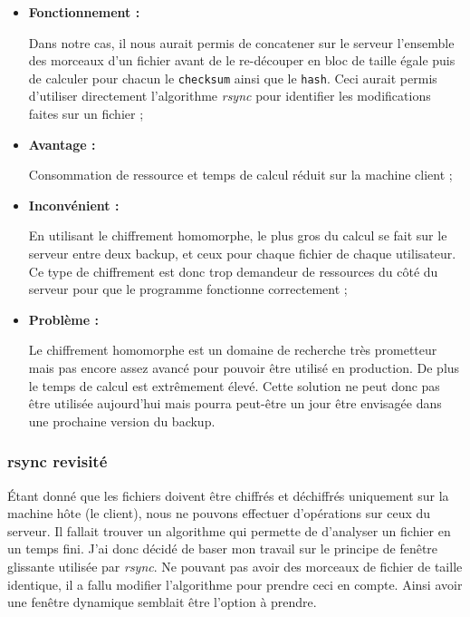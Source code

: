 \documentclass[a4paper,10pt, twoside]{report}
\begin{document}
\begin{spacing}{1.2}
\begin{itemize}
 \item \textbf{Fonctionnement :}
 
 Dans notre cas, il nous aurait permis de
 concatener sur le serveur l'ensemble des morceaux d'un fichier avant de le
 re-découper en bloc de taille égale puis de calculer pour chacun le
 \texttt{checksum} ainsi que le \texttt{hash}. Ceci aurait permis d'utiliser
 directement l'algorithme \textit{rsync} pour identifier les modifications
 faites sur un fichier ;

 \item \textbf{Avantage :}
 
 Consommation de ressource et temps de calcul
 réduit sur la machine client ;
 
 \item \textbf{Inconvénient :}
 
 En utilisant le chiffrement homomorphe, le
 plus gros du calcul se fait sur le serveur entre deux backup, et ceux pour
 chaque fichier de chaque utilisateur. Ce type de chiffrement est donc trop
 demandeur de ressources du côté du serveur pour que le programme fonctionne
 correctement ;

 \item \textbf{Problème :}
 
 Le chiffrement homomorphe est un domaine de
 recherche très prometteur mais pas encore assez avancé pour pouvoir
 être utilisé en production. De plus le temps de calcul est extrêmement
 élevé. Cette solution ne peut donc pas être utilisée aujourd'hui mais
 pourra peut-être un jour être envisagée dans une prochaine version du
 backup.
\end{itemize}

\subsubsection{rsync revisité}

Étant donné que les fichiers doivent être chiffrés et déchiffrés
uniquement sur la machine hôte (le client), nous ne pouvons effectuer
d'opérations sur ceux du serveur. Il fallait trouver un algorithme qui
permette de d'analyser un fichier en un temps fini. J'ai donc décidé de
baser mon travail sur le principe de fenêtre glissante utilisée par
\textit{rsync}. Ne pouvant pas avoir des morceaux de fichier de taille
identique, il a fallu modifier l'algorithme pour prendre ceci en compte. Ainsi
avoir une fenêtre dynamique semblait être l'option à prendre.


\end{spacing}
\end{document}
